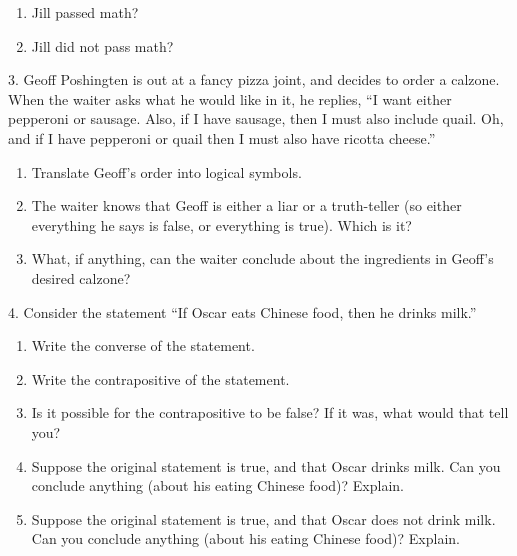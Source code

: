 \documentclass[10pt,]{book}
\theoremstyle{plain}
\theoremstyle{definition}
\theoremstyle{definition}
\numberwithin{equation}{chapter}
\begin{document}
\begin{exerciselist}
\begin{enumerate}[label=(\alph*)]
\begin{enumerate}[label=\roman*.]
\item\hypertarget{li-166}{}Jill passed math?%
\item\hypertarget{li-167}{}Jill did not pass math?%
\end{enumerate}
%
\end{enumerate}
\par\smallskip
\item[3.]\hypertarget{exercise-13}{}\hypertarget{p-295}{}%
Geoff Poshingten is out at a fancy pizza joint, and decides to order a calzone. When the waiter asks what he would like in it, he replies, ``I want either pepperoni or sausage. Also, if I have sausage, then I must also include quail. Oh, and if I have pepperoni or quail then I must also have ricotta cheese.''%
\leavevmode%
\begin{enumerate}[label=(\alph*)]
\item\hypertarget{li-175}{}\hypertarget{p-296}{}%
Translate Geoff's order into logical symbols.%
\item\hypertarget{li-176}{}\hypertarget{p-297}{}%
The waiter knows that Geoff is either a liar or a truth-teller (so either everything he says is false, or everything is true).  Which is it?%
\item\hypertarget{li-177}{}\hypertarget{p-298}{}%
What, if anything, can the waiter conclude about the ingredients in Geoff's desired calzone?%
\end{enumerate}
\par\smallskip
\item[4.]\hypertarget{exercise-14}{}\hypertarget{p-299}{}%
Consider the statement ``If Oscar eats Chinese food, then he drinks milk.''%
\leavevmode%
\begin{enumerate}[label=(\alph*)]
\item\hypertarget{li-178}{}\hypertarget{p-300}{}%
Write the converse of the statement.%
\item\hypertarget{li-179}{}\hypertarget{p-301}{}%
Write the contrapositive of the statement.%
\item\hypertarget{li-180}{}\hypertarget{p-302}{}%
Is it possible for the contrapositive to be false? If it was, what would that tell you?%
\item\hypertarget{li-181}{}\hypertarget{p-303}{}%
Suppose the original statement is true, and that Oscar drinks milk. Can you conclude anything (about his eating Chinese food)? Explain.%
\item\hypertarget{li-182}{}\hypertarget{p-304}{}%
Suppose the original statement is true, and that Oscar does not drink milk. Can you conclude anything (about his eating Chinese food)? Explain.%

\end{enumerate}
\end{exerciselist}
\end{document}
